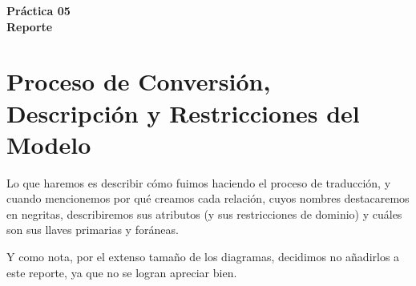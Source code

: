 \documentclass[11pt]{article}
\begin{document}
\begin{center}
	\LARGE{\textbf{Práctica 05\\Reporte}}
\end{center}

\section*{Proceso de Conversión, Descripción y Restricciones del Modelo}
Lo que haremos es describir cómo fuimos haciendo el proceso de traducción, y cuando mencionemos por qué creamos cada relación, cuyos nombres destacaremos en negritas, describiremos sus atributos (y sus restricciones de dominio) y cuáles son sus llaves primarias y foráneas.\par
Y como nota, por el extenso tamaño de los diagramas, decidimos no añadirlos a este reporte, ya que no se logran apreciar bien. 
\end{document}
